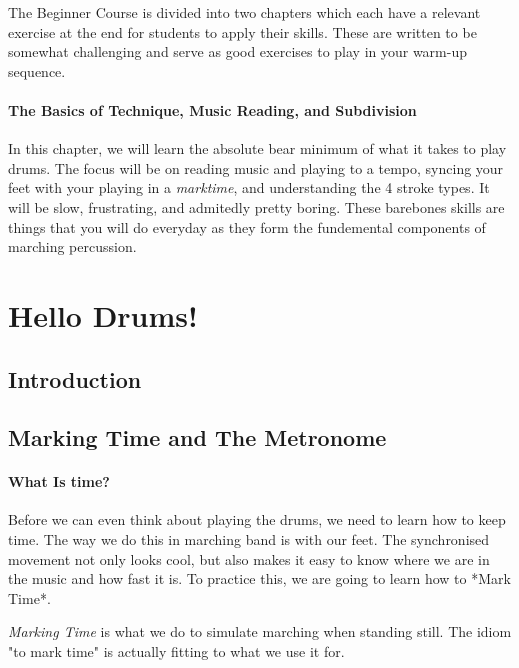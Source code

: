 \documentclass[12pt,letterpaper]{book}
\begin{document}
The Beginner Course is divided into two chapters which each have a relevant exercise at the end for students to apply their skills.  These are written to be somewhat challenging and serve as good exercises to play in your warm-up sequence.

\paragraph{The Basics of Technique, Music Reading, and Subdivision}

In this chapter, we will learn the absolute bear minimum of what it takes to play drums.  The focus will be on reading music and playing to a tempo, syncing your feet with your playing in a \textit{marktime}, and understanding the 4 stroke types.  It will be slow, frustrating, and admitedly pretty boring.  These barebones skills are things that you will do everyday as they form the fundemental components of marching percussion.

\section{Hello Drums!}

\subsection{Introduction}


\subsection{Marking Time and The Metronome}

\paragraph{What Is time?} 

Before we can even think about playing the drums, we need to learn how to keep time. The way we do this in marching band is with our feet.  The synchronised movement not only looks cool, but also makes it easy to know where we are in the music and how fast it is.  To practice this, we are going to learn how to *Mark Time*.

\textit{Marking Time} is what we do to simulate marching when standing still.  The idiom "to mark time" is actually fitting to what we use it for.
\end{document}
